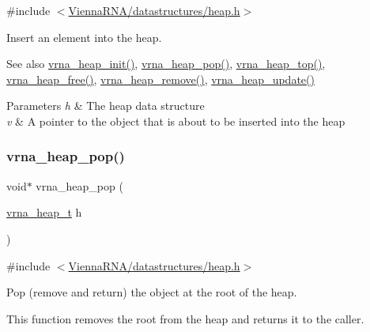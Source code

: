 {\ttfamily \#include $<$\mbox{\hyperlink{heap_8h}{Vienna\+R\+N\+A/datastructures/heap.\+h}}$>$}



Insert an element into the heap. 

\begin{DoxySeeAlso}{See also}
\mbox{\hyperlink{group__heap__utils_gafd02db4841338bad6f551e3e2bd2161f}{vrna\+\_\+heap\+\_\+init()}}, \mbox{\hyperlink{group__heap__utils_ga3b6242f3a1194eb1df2d1fb40d630610}{vrna\+\_\+heap\+\_\+pop()}}, \mbox{\hyperlink{group__heap__utils_ga534a8483824371019241e340c026111b}{vrna\+\_\+heap\+\_\+top()}}, \mbox{\hyperlink{group__heap__utils_ga2a4915c6e66b8831644857df0715c3ce}{vrna\+\_\+heap\+\_\+free()}}, \mbox{\hyperlink{group__heap__utils_ga5e181d5ef8557d502943b938620c7174}{vrna\+\_\+heap\+\_\+remove()}}, \mbox{\hyperlink{group__heap__utils_gabdd04b8719b3d85c5ad53ed7dec9700b}{vrna\+\_\+heap\+\_\+update()}}
\end{DoxySeeAlso}

\begin{DoxyParams}{Parameters}
{\em h} & The heap data structure \\
\hline
{\em v} & A pointer to the object that is about to be inserted into the heap \\
\hline
\end{DoxyParams}
\mbox{\label{group__heap__utils_ga3b6242f3a1194eb1df2d1fb40d630610}} 
\subsubsection{\texorpdfstring{vrna\_heap\_pop()}{vrna\_heap\_pop()}}
{\footnotesize\ttfamily void$\ast$ vrna\+\_\+heap\+\_\+pop (\begin{DoxyParamCaption}\item[{\mbox{\hyperlink{group__heap__utils_ga341ea87a651145b986792f6eb3e679c3}{vrna\+\_\+heap\+\_\+t}}}]{h }\end{DoxyParamCaption})}



{\ttfamily \#include $<$\mbox{\hyperlink{heap_8h}{Vienna\+R\+N\+A/datastructures/heap.\+h}}$>$}



Pop (remove and return) the object at the root of the heap. 

This function removes the root from the heap and returns it to the caller.

